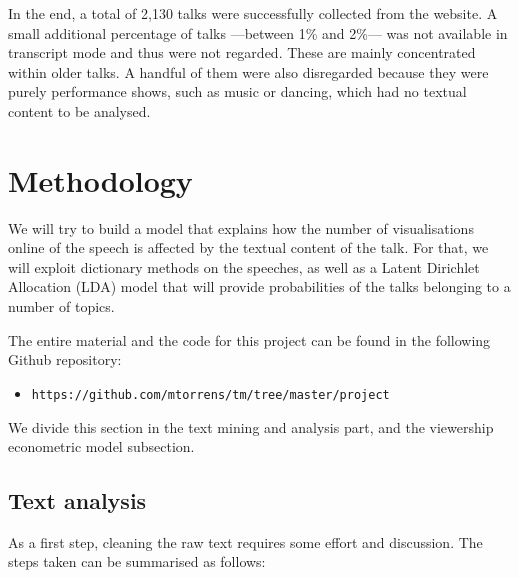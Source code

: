 \documentclass[a4paper, 11pt]{article} %
\begin{document}
In the end, a total of 2,130 talks were successfully collected from the website. A small additional percentage of talks ---between 1\% and 2\%--- was not available in transcript mode and thus were not regarded. These are mainly concentrated within older talks. A handful of them were also disregarded because they were purely performance shows, such as music or dancing, which had no textual content to be analysed.

\section*{Methodology}

We will try to build a model that explains how the number of visualisations online of the speech is affected by the textual content of the talk. For that, we will exploit dictionary methods on the speeches, as well as a Latent Dirichlet Allocation (LDA) model that will provide probabilities of the talks belonging to a number of topics.

The entire material and the code for this project can be found in the following Github repository:

\begin{itemize}
\item \texttt{https://github.com/mtorrens/tm/tree/master/project}
\end{itemize}

We divide this section in the text mining and analysis part, and the viewership econometric model subsection.

\subsection*{Text analysis}

As a first step, cleaning the raw text requires some effort and discussion. The steps taken can be summarised as follows:
\end{document}
